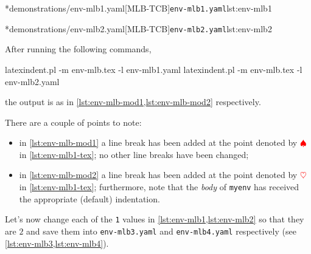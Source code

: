 		\begin{minipage}{.45\textwidth}
			\cmhlistingsfromfile[style=yaml-LST]*{demonstrations/env-mlb1.yaml}[MLB-TCB]{\texttt{env-mlb1.yaml}}{lst:env-mlb1}
		\end{minipage}
		\hfill
		\begin{minipage}{.45\textwidth}
			\cmhlistingsfromfile[style=yaml-LST]*{demonstrations/env-mlb2.yaml}[MLB-TCB]{\texttt{env-mlb2.yaml}}{lst:env-mlb2}
		\end{minipage}

		After running the following commands,
		\begin{commandshell}
latexindent.pl -m env-mlb.tex -l env-mlb1.yaml
latexindent.pl -m env-mlb.tex -l env-mlb2.yaml
\end{commandshell}
		the output is as in \cref{lst:env-mlb-mod1,lst:env-mlb-mod2} respectively.

		\begin{widepage}
			\begin{minipage}{.56\linewidth}
			\end{minipage}
			\hfill
			\begin{minipage}{.43\linewidth}
			\end{minipage}
		\end{widepage}

		There are a couple of points to note:
		\begin{itemize}
			\item in \cref{lst:env-mlb-mod1} a line break has been added at the point denoted by
			      $\color{red}\spadesuit$ in \cref{lst:env-mlb1-tex}; no other line breaks have been
			      changed;
			\item in \cref{lst:env-mlb-mod2} a line break has been added at the point denoted by
			      $\color{red}\heartsuit$ in \cref{lst:env-mlb1-tex}; furthermore, note that the \emph{body}
			      of \texttt{myenv} has received the appropriate (default) indentation.
		\end{itemize}

		Let's now change each of the \texttt{1} values in \cref{lst:env-mlb1,lst:env-mlb2} so
		that they are $2$ and save them into \texttt{env-mlb3.yaml} and \texttt{env-mlb4.yaml}
		respectively (see \cref{lst:env-mlb3,lst:env-mlb4}).

